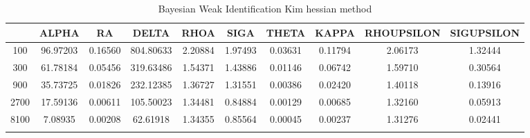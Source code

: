 \documentclass[a4paper,10pt]{article}
\begin{document}
\centering
\begin{longtable}{cccccccccc}
\toprule
 & ALPHA & RA & DELTA & RHOA & SIGA & THETA & KAPPA & RHOUPSILON & SIGUPSILON \\
\midrule
100 & 96.97203 & 0.16560 & 804.80633 & 2.20884 & 1.97493 & 0.03631 & 0.11794 & 2.06173 & 1.32444 \\
300 & 61.78184 & 0.05456 & 319.63486 & 1.54371 & 1.43886 & 0.01146 & 0.06742 & 1.59710 & 0.30564 \\
900 & 35.73725 & 0.01826 & 232.12385 & 1.36727 & 1.31551 & 0.00386 & 0.02420 & 1.40118 & 0.13916 \\
2700 & 17.59136 & 0.00611 & 105.50023 & 1.34481 & 0.84884 & 0.00129 & 0.00685 & 1.32160 & 0.05913 \\
8100 & 7.08935 & 0.00208 & 62.61918 & 1.34355 & 0.85564 & 0.00045 & 0.00237 & 1.31276 & 0.02441 \\
\bottomrule
\caption{Bayesian Weak Identification Kim hessian method}
\label{table:tbl:WeakKim_hessian}
\end{longtable}
\end{document}
